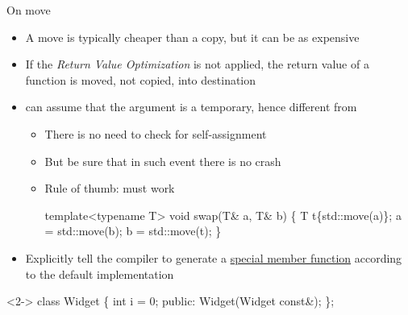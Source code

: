 \begin{frame}[fragile]{On move}
  \begin{itemize}
  \item<1-> A move is typically cheaper than a copy, but it can be as expensive
  \item<2-> If the \textit{Return Value Optimization} is not applied, the return
    value of a function is moved, not copied, into destination
  \item<3->  can assume that the argument is a temporary,
    hence different from 
    \begin{itemize}
    \item There is no need to check for self-assignment
    \item But be sure that in such event there is no crash
    \item Rule of thumb:  must work

      \begin{codeblock}
template<typename T>
void swap(T& a, T& b) \{
  T t\{std::move(a)\};
  a = std::move(b);
  b = std::move(t);
\}\end{codeblock}

    \end{itemize}
  \end{itemize}
\end{frame}

\begin{frame}[fragile]{}
  \begin{itemize}
  \item Explicitly tell the compiler to generate a \underline{special member
    function} according to the default implementation
  \end{itemize}

  \begin{codeblock}<2->
class Widget \{
  int i = 0;
 public:
  Widget(Widget const&);
\};

\end{codeblock}

\end{frame}

